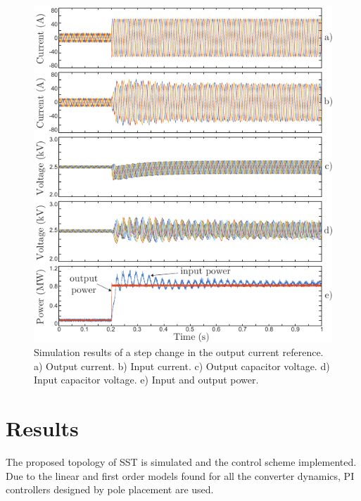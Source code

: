 \documentclass[conference]{IEEEtran}
\begin{document}
\begin{figure}[!t]
\centering
\includegraphics[width=\columnwidth]{images/results01-comprimido.pdf}
\caption{Simulation results of a step change in the output current reference. a) Output current. b) Input current. c) Output capacitor voltage. d) Input capacitor voltage. e) Input and output power.}
\label{fig:results01}
\end{figure}


\section{Results}
The proposed topology of SST is simulated and the control scheme implemented. Due to the linear and first order models found for all the converter dynamics, PI controllers designed by pole placement are used.
\end{document}
